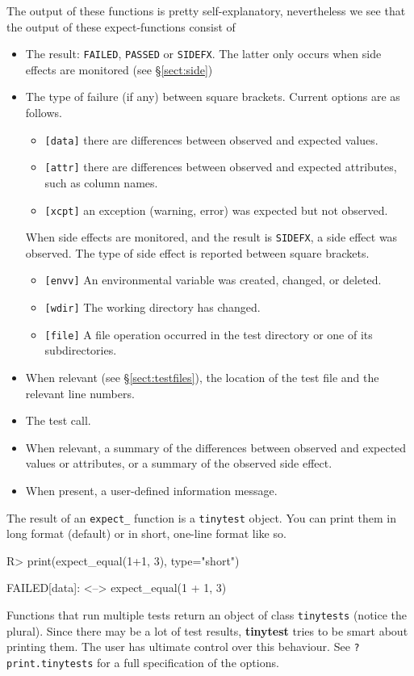 \documentclass[11pt]{article}
\newcommand{\code}[1]{\texttt{#1}}
\newcommand{\pkg}[1]{\textbf{#1}}
\let\oldmarginpar\marginpar
\renewcommand{\marginpar}[1]{\oldmarginpar{\color{bluetext}\raggedleft\scriptsize #1}}
\begin{document}
The output of these functions is pretty self-explanatory, nevertheless we see
that the output of these expect-functions consist of
\begin{itemize}
\item The result: \code{FAILED}, \code{PASSED} or \code{SIDEFX}. The latter only occurs
  when side effects are monitored (see \S\ref{sect:side})
  \item The type of failure (if any) between square brackets. Current options
       are as follows.
  \begin{itemize}
    \item \code{[data]} there are differences between observed and expected values.
    \item \code{[attr]} there are differences between observed and expected attributes, such as column names.
    \item \code{[xcpt]} an exception (warning, error) was expected but not observed.
  \end{itemize}
    When side effects are monitored, and the result is \code{SIDEFX}, a side
    effect was observed. The type of side effect is reported between square brackets.
  \begin{itemize}
    \item \code{[envv]} An environmental variable was created, changed, or deleted.
    \item \code{[wdir]} The working directory has changed.
    \item \code{[file]} A file operation occurred in the test directory or one of its subdirectories.
   \end{itemize}
  \item When relevant (see \S\ref{sect:testfiles}), the location of the test file and the relevant line numbers.
  \item The test call.
  \item When relevant, a summary of the differences between observed and expected
    values or attributes, or a summary of the observed side effect.
  \item When present, a user-defined information message.
\end{itemize}

The result of an \code{expect\_} function is a \code{tinytest} object. You can
print them in long format (default) or in short, one-line format like so.
\begin{Schunk}
\begin{Sinput}
R>  print(expect_equal(1+1, 3), type="short")
\end{Sinput}
\begin{Soutput}
FAILED[data]: <--> expect_equal(1 + 1, 3) 
\end{Soutput}
\end{Schunk}
\marginpar{\code{print} method}
Functions that run multiple tests return an object of class \code{tinytests}
(notice the plural). Since there may be a lot of test results, \pkg{tinytest}
tries to be smart about printing them. The user has ultimate control over this
behaviour. See \code{?print.tinytests} for a full specification of the options.
\end{document}
